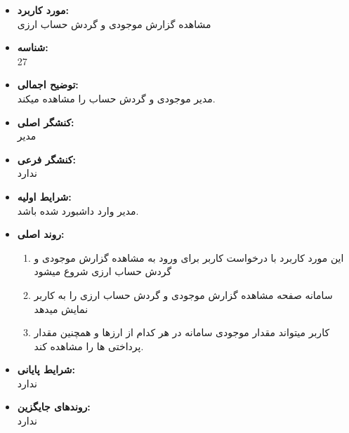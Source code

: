 \documentclass{article}
\begin{document}
\begin{itemize}
\item \textbf{مورد کاربرد:}\\
مشاهده گزارش موجودی و گردش حساب ارزی
\item \textbf{شناسه:}\\
27
\item \textbf{توضیح اجمالی:}\\
مدیر موجودی و گردش حساب را مشاهده میکند.
\item \textbf{کنشگر اصلی:}\\
مدیر
\item \textbf{کنشگر فرعی:}\\
ندارد
\item \textbf{شرایط اولیه:}\\
مدیر وارد داشبورد شده باشد.
\item \textbf{روند اصلی:}\\
\begin{enumerate}
\item  این مورد کاربرد با درخواست کاربر برای ورود به مشاهده گزارش موجودی و گردش حساب ارزی شروع میشود
\item سامانه صفحه مشاهده گزارش موجودی و گردش حساب ارزی را به کاربر نمایش میدهد
\item کاربر میتواند مقدار موجودی سامانه در هر کدام از ارزها و همچنین مقدار پرداختی ها را مشاهده کند.
\end{enumerate}
\item \textbf{شرایط پایانی:}\\ 
ندارد
\item \textbf{روندهای جایگزین:}\\
ندارد
\end{itemize}
\noindent\makebox[\linewidth]{\rule{\paperwidth}{0.4pt}}
\end{document}
